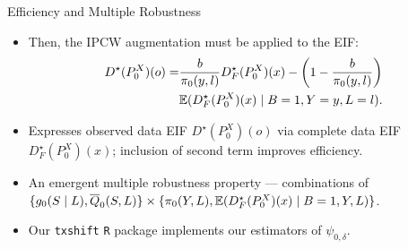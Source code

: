 \documentclass{beamer}
\begin{document}
\begin{frame}[c]{Efficiency and Multiple Robustness~\citep{hejazi2020efficient}}

\begin{center}
\begin{itemize}
  \itemsep8pt
  \item Then, the IPCW augmentation must be applied to the EIF\footnotemark:
    \begin{align*}
      D^{\star}(P_0^X)(o) = &\frac{b}{\pi_0(y, l)} D^{\star}_F(P_0^X)(x) -
        \left(1 - \frac{b}{\pi_0(y, l)}\right) \\
        &\mathbb{E}(D^{\star}_F(P_0^X)(x) \mid B = 1, Y = y, L = l).
    \end{align*}
  \item Expresses observed data EIF $D^{\star}(P_0^X)(o)$ via complete data
     EIF $D^{\star}_F(P_0^X)(x)$; inclusion of second term improves efficiency.
 \item An emergent multiple robustness property --- combinations of
    $\{g_0(S \mid L), \overline{Q}_0(S,L)\} \times \{\pi_0(Y, L),
    \mathbb{E}(D^{\star}_F(P^X_0)(x) \mid B = 1, Y, L)\}$.
  \item Our \texttt{txshift} \texttt{R} package implements our estimators of
    $\psi_{0,\delta}$.
\end{itemize}
\end{center}



\end{frame}





\end{document}
